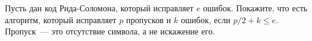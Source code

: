 Пусть дан код Рида-Соломона, который исправляет $e$ ошибок. Покажите, что есть алгоритм, который исправляет $p$ пропусков и
$k$ ошибок, если $p / 2 + k \le e$. Пропуск~--- это отсутствие символа, а не искажение его.